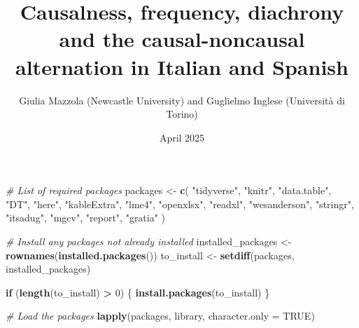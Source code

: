 \documentclass[
]{article}
\title{Causalness, frequency, diachrony and the causal-noncausal
alternation in Italian and Spanish}
\author{Giulia Mazzola (Newcastle University) and Guglielmo Inglese
(Università di Torino)}
\date{April 2025}
\newenvironment{Shaded}{\begin{snugshade}}{\end{snugshade}}
\newcommand{\AttributeTok}[1]{\textcolor[rgb]{0.13,0.29,0.53}{#1}}
\newcommand{\CommentTok}[1]{\textcolor[rgb]{0.56,0.35,0.01}{\textit{#1}}}
\newcommand{\ConstantTok}[1]{\textcolor[rgb]{0.56,0.35,0.01}{#1}}
\newcommand{\ControlFlowTok}[1]{\textcolor[rgb]{0.13,0.29,0.53}{\textbf{#1}}}
\newcommand{\DecValTok}[1]{\textcolor[rgb]{0.00,0.00,0.81}{#1}}
\newcommand{\FunctionTok}[1]{\textcolor[rgb]{0.13,0.29,0.53}{\textbf{#1}}}
\newcommand{\NormalTok}[1]{#1}
\newcommand{\OtherTok}[1]{\textcolor[rgb]{0.56,0.35,0.01}{#1}}
\newcommand{\SpecialCharTok}[1]{\textcolor[rgb]{0.81,0.36,0.00}{\textbf{#1}}}
\newcommand{\StringTok}[1]{\textcolor[rgb]{0.31,0.60,0.02}{#1}}
\begin{document}
\maketitle

\begin{Shaded}
\begin{Highlighting}[]
\CommentTok{\# List of required packages}
\NormalTok{packages }\OtherTok{\textless{}{-}} \FunctionTok{c}\NormalTok{(}
  \StringTok{"tidyverse"}\NormalTok{, }\StringTok{"knitr"}\NormalTok{, }\StringTok{"data.table"}\NormalTok{, }\StringTok{"DT"}\NormalTok{, }\StringTok{"here"}\NormalTok{, }\StringTok{"kableExtra"}\NormalTok{,}
  \StringTok{"lme4"}\NormalTok{, }\StringTok{"openxlsx"}\NormalTok{, }\StringTok{"readxl"}\NormalTok{, }\StringTok{"wesanderson"}\NormalTok{, }\StringTok{"stringr"}\NormalTok{,}
  \StringTok{"itsadug"}\NormalTok{, }\StringTok{"mgcv"}\NormalTok{, }\StringTok{"report"}\NormalTok{, }\StringTok{"gratia"}
\NormalTok{)}

\CommentTok{\# Install any packages not already installed}
\NormalTok{installed\_packages }\OtherTok{\textless{}{-}} \FunctionTok{rownames}\NormalTok{(}\FunctionTok{installed.packages}\NormalTok{())}
\NormalTok{to\_install }\OtherTok{\textless{}{-}} \FunctionTok{setdiff}\NormalTok{(packages, installed\_packages)}

\ControlFlowTok{if}\NormalTok{ (}\FunctionTok{length}\NormalTok{(to\_install) }\SpecialCharTok{\textgreater{}} \DecValTok{0}\NormalTok{) \{}
  \FunctionTok{install.packages}\NormalTok{(to\_install)}
\NormalTok{\}}

\CommentTok{\# Load the packages}
\FunctionTok{lapply}\NormalTok{(packages, library, }\AttributeTok{character.only =} \ConstantTok{TRUE}\NormalTok{)}
\end{Highlighting}
\end{Shaded}
\end{document}
